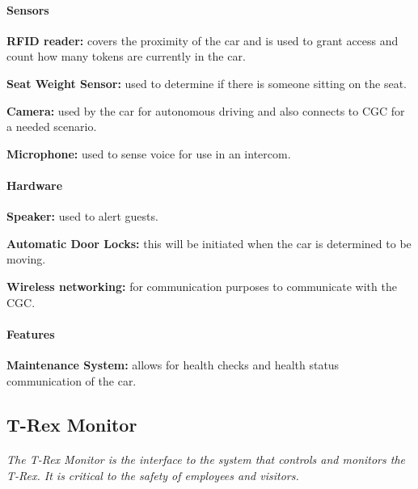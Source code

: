 \documentclass[12pt]{article}
\begin{document}
	\paragraph{Sensors}
	\begin{list}{}{}
		\item \textbf{RFID reader: }covers the proximity of the car and is used 
		to grant access and count how many tokens are currently in the car. 
		\item \textbf{Seat Weight Sensor: }used to determine if there is someone 
		sitting on the seat. 
		\item \textbf{Camera: }used by the car for autonomous driving and also 
		connects to CGC for a needed scenario. 
		\item \textbf{Microphone: }used to sense voice for use in an intercom.
	\end{list}
		
	\paragraph{Hardware}
	\begin{list}{}{}
		\item \textbf{Speaker: }used to alert guests.
		\item \textbf{Automatic Door Locks: }this will be initiated when the car 
		is determined to be moving.
		\item \textbf{Wireless networking: }for communication purposes to communicate 
		with the CGC.
	\end{list}
	
	\paragraph{Features}
	\begin{list}{}{}
		\item \textbf{Maintenance System: }allows for health checks and health status 
		communication of the car.  
	\end{list}

	\subsection{T-Rex Monitor}
	\paragraph{} \textit{ The T-Rex Monitor is the interface to the system that controls and monitors the T-Rex. It is critical to the safety of employees and visitors. }
		
\end{document}
